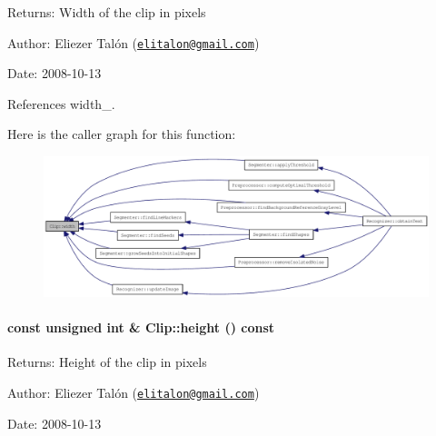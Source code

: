 \begin{Desc}
\item[Returns:]Width of the clip in pixels\end{Desc}
\begin{Desc}
\item[Author:]Eliezer Talón (\href{mailto:elitalon@gmail.com}{\tt elitalon@gmail.com}) \end{Desc}
\begin{Desc}
\item[Date:]2008-10-13 \end{Desc}


References width\_\-.

Here is the caller graph for this function:\nopagebreak
\begin{figure}[H]
\begin{center}
\leavevmode
\includegraphics[width=420pt]{class_clip_88d1a47c0ec077e8c6680785509389b0_icgraph}
\end{center}
\end{figure}
\hypertarget{class_clip_939908a8dde602d25335792cc0fd5d97}{
\paragraph[height]{\setlength{\rightskip}{0pt plus 5cm}const unsigned int \& Clip::height () const}\hfill}
\label{class_clip_939908a8dde602d25335792cc0fd5d97}


\begin{Desc}
\item[Returns:]Height of the clip in pixels\end{Desc}
\begin{Desc}
\item[Author:]Eliezer Talón (\href{mailto:elitalon@gmail.com}{\tt elitalon@gmail.com}) \end{Desc}
\begin{Desc}
\item[Date:]2008-10-13 \end{Desc}


